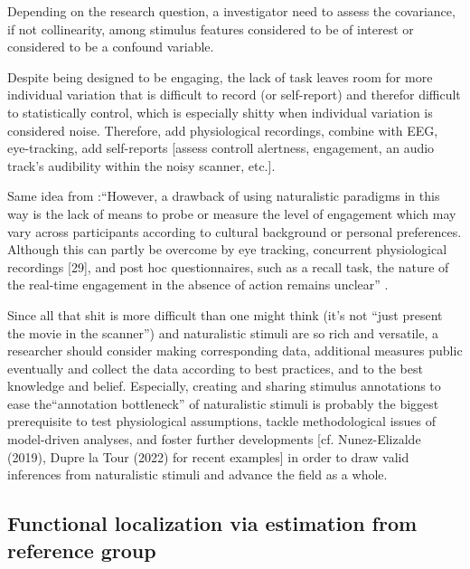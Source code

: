 %
Depending on the research question, a investigator need to assess the
covariance, if not collinearity, among stimulus features considered to be of
interest or considered to be a confound variable.

%
Despite being designed to be engaging, the lack of task leaves room for more
individual variation that is difficult to record (or self-report) and therefor
difficult to statistically control, which is especially shitty when individual
variation is considered noise.
%
Therefore, add physiological recordings, combine with EEG, eye-tracking, add
self-reports [assess controll alertness, engagement, an audio track's audibility
within the noisy scanner, etc.].

%
Same idea from \citet{sonkusare2019naturalistic}:``However, a drawback of using
naturalistic paradigms in this way is the lack of means to probe or measure the
level of engagement which may vary across participants according to cultural
background or personal preferences.
%
Although this can partly be overcome by eye tracking, concurrent physiological
recordings [29], and post hoc questionnaires, such as a recall task, the nature
of the real-time engagement in the absence of action remains unclear''
\citep{sonkusare2019naturalistic}.

%

%
Since all that shit is more difficult than one might think (it's not ``just
present the movie in the scanner'') and naturalistic stimuli are so rich and
versatile, a researcher should consider making corresponding data, additional
measures public eventually and collect the data according to best practices, and
to the best knowledge and belief.
%
Especially, creating and sharing stimulus annotations to ease the``annotation
bottleneck'' \citep[][p. 16]{aliko2020naturalistic} of naturalistic stimuli is
probably the biggest prerequisite to test physiological assumptions, tackle
methodological issues of model-driven analyses, and foster further developments
[cf.  Nunez-Elizalde (2019), Dupre la Tour (2022) for recent examples] in order
to draw valid inferences from naturalistic stimuli and advance the field as a
whole.


\subsection{Functional localization via estimation from reference group}

